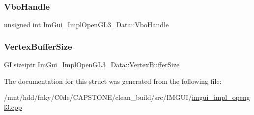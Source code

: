 \subsubsection{\texorpdfstring{Vbo\+Handle}{VboHandle}}
{\footnotesize\ttfamily unsigned int Im\+Gui\+\_\+\+Impl\+Open\+G\+L3\+\_\+\+Data\+::\+Vbo\+Handle}

\mbox{\label{structImGui__ImplOpenGL3__Data_a8f348c0ed41f34ec5ca6032537526491}} 
\subsubsection{\texorpdfstring{Vertex\+Buffer\+Size}{VertexBufferSize}}
{\footnotesize\ttfamily \hyperlink{imgui__impl__opengl3__loader_8h_a45f630b0dfee935f0aed0010167cddb5}{G\+Lsizeiptr} Im\+Gui\+\_\+\+Impl\+Open\+G\+L3\+\_\+\+Data\+::\+Vertex\+Buffer\+Size}



The documentation for this struct was generated from the following file\+:\begin{DoxyCompactItemize}
\item 
/mnt/hdd/fnky/\+C0de/\+C\+A\+P\+S\+T\+O\+N\+E/clean\+\_\+build/src/\+I\+M\+G\+U\+I/\hyperlink{imgui__impl__opengl3_8cpp}{imgui\+\_\+impl\+\_\+opengl3.\+cpp}\end{DoxyCompactItemize}
